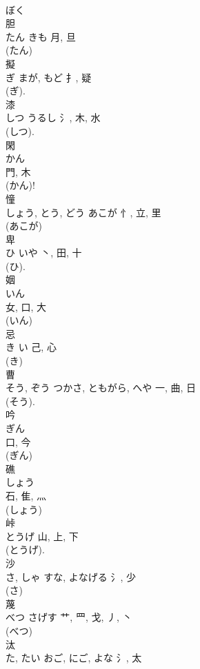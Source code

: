 \documentclass[8pt]{extreport}
\begin{document}
\begin{CJK}{UTF8}{min}
\\	ぼく 
\\	胆	
\\	たん	きも	月, 旦	
\\	(たん) 
\\	擬	
\\	ぎ	まが, もど	扌, 疑	
\\	(ぎ). 
\\	漆	
\\	しつ	うるし	氵, 木, 水		
\\	(しつ). 
\\	閑	
\\	かん	
\\	門, 木	
\\	(かん)! 
\\	憧	
\\	しょう, とう, どう	あこが	忄, 立, 里	
\\	(あこが) 
\\	卑	
\\	ひ	いや	丶, 田, 十	
\\	(ひ). 
\\	姻	
\\	いん	
\\	女, 口, 大	
\\	(いん) 
\\	忌	
\\	き	い	己, 心	
\\	(き) 
\\	曹	
\\	そう, ぞう	つかさ, ともがら, へや	一, 曲, 日	
\\	(そう). 
\\	吟	
\\	ぎん	
\\	口, 今	
\\	(ぎん) 
\\	礁	
\\	しょう	
\\	石, 隹, 灬	
\\	(しょう) 
\\	峠	
\\	とうげ	山, 上, 下	
\\	(とうげ). 
\\	沙	
\\	さ, しゃ	すな, よなげる	氵, 少	
\\	(さ) 
\\	蔑	
\\	べつ	さげす	艹, 罒, 戈, 丿, 丶	
\\	(べつ) 
\\	汰	
\\	た, たい	おご, にご, よな	氵, 太	

\end{CJK}
\end{document}
